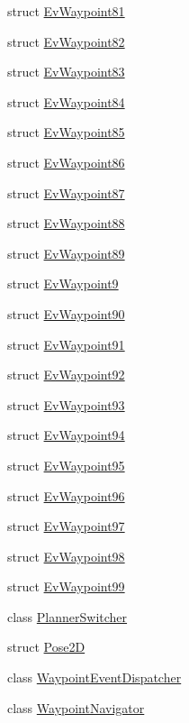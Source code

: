 \begin{DoxyCompactItemize}
\item 
struct \hyperlink{structmove__base__z__client_1_1EvWaypoint81}{Ev\+Waypoint81}
\item 
struct \hyperlink{structmove__base__z__client_1_1EvWaypoint82}{Ev\+Waypoint82}
\item 
struct \hyperlink{structmove__base__z__client_1_1EvWaypoint83}{Ev\+Waypoint83}
\item 
struct \hyperlink{structmove__base__z__client_1_1EvWaypoint84}{Ev\+Waypoint84}
\item 
struct \hyperlink{structmove__base__z__client_1_1EvWaypoint85}{Ev\+Waypoint85}
\item 
struct \hyperlink{structmove__base__z__client_1_1EvWaypoint86}{Ev\+Waypoint86}
\item 
struct \hyperlink{structmove__base__z__client_1_1EvWaypoint87}{Ev\+Waypoint87}
\item 
struct \hyperlink{structmove__base__z__client_1_1EvWaypoint88}{Ev\+Waypoint88}
\item 
struct \hyperlink{structmove__base__z__client_1_1EvWaypoint89}{Ev\+Waypoint89}
\item 
struct \hyperlink{structmove__base__z__client_1_1EvWaypoint9}{Ev\+Waypoint9}
\item 
struct \hyperlink{structmove__base__z__client_1_1EvWaypoint90}{Ev\+Waypoint90}
\item 
struct \hyperlink{structmove__base__z__client_1_1EvWaypoint91}{Ev\+Waypoint91}
\item 
struct \hyperlink{structmove__base__z__client_1_1EvWaypoint92}{Ev\+Waypoint92}
\item 
struct \hyperlink{structmove__base__z__client_1_1EvWaypoint93}{Ev\+Waypoint93}
\item 
struct \hyperlink{structmove__base__z__client_1_1EvWaypoint94}{Ev\+Waypoint94}
\item 
struct \hyperlink{structmove__base__z__client_1_1EvWaypoint95}{Ev\+Waypoint95}
\item 
struct \hyperlink{structmove__base__z__client_1_1EvWaypoint96}{Ev\+Waypoint96}
\item 
struct \hyperlink{structmove__base__z__client_1_1EvWaypoint97}{Ev\+Waypoint97}
\item 
struct \hyperlink{structmove__base__z__client_1_1EvWaypoint98}{Ev\+Waypoint98}
\item 
struct \hyperlink{structmove__base__z__client_1_1EvWaypoint99}{Ev\+Waypoint99}
\item 
class \hyperlink{classmove__base__z__client_1_1PlannerSwitcher}{Planner\+Switcher}
\item 
struct \hyperlink{structmove__base__z__client_1_1Pose2D}{Pose2D}
\item 
class \hyperlink{classmove__base__z__client_1_1WaypointEventDispatcher}{Waypoint\+Event\+Dispatcher}
\item 
class \hyperlink{classmove__base__z__client_1_1WaypointNavigator}{Waypoint\+Navigator}
\end{DoxyCompactItemize}
